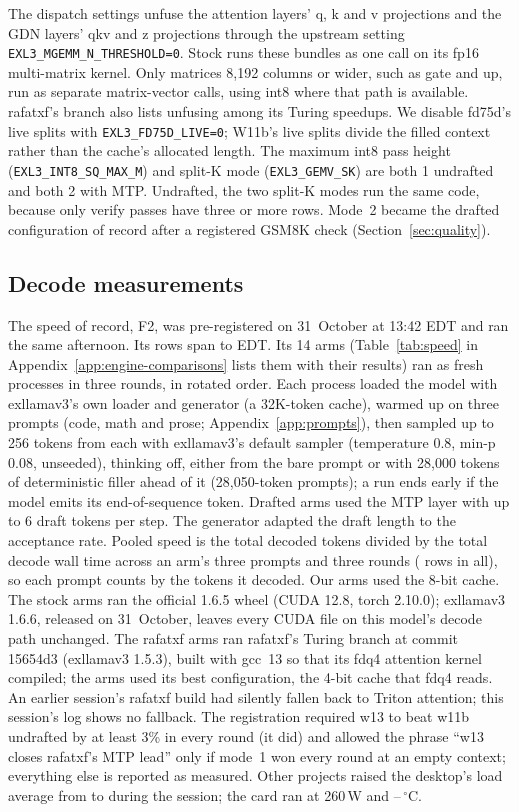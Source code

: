 \documentclass[11pt,letterpaper]{article}
\newcommand{\q}[1]{\texttt{#1}}
\begin{document}
The dispatch settings unfuse the attention layers' q, k and v projections
and the GDN layers' qkv and z projections through the upstream setting
\q{EXL3\_MGEMM\_N\_THRESHOLD=0}. Stock runs these bundles as one call on its
fp16 multi-matrix kernel. Only matrices 8,192 columns or wider, such as gate
and up, run as separate matrix-vector calls, using int8 where that path is
available. rafatxf's branch also lists unfusing among its Turing speedups.
We disable fd75d's live splits with \q{EXL3\_FD75D\_LIVE=0}; W11b's live
splits divide the filled context rather than the cache's allocated length.
The maximum int8 pass height (\q{EXL3\_INT8\_SQ\_MAX\_M}) and split-K mode
(\q{EXL3\_GEMV\_SK}) are both 1 undrafted and both 2 with MTP. Undrafted, the two split-K modes run the
same code, because only verify passes have three or more rows. Mode~2 became
the drafted configuration of record after a registered GSM8K check
(Section~\ref{sec:quality}).



\subsection{Decode measurements}
\label{sec:speedsetup}
The speed of record, F2, was pre-registered on 31~October at 13:42 EDT and
ran the same afternoon. Its rows span \PeFtFirst{} to \PeFtLast{} EDT. Its 14
arms (Table~\ref{tab:speed} in Appendix~\ref{app:engine-comparisons} lists them with their results) ran as fresh
processes in three rounds, in rotated order. Each process loaded the model with exllamav3's own loader and
generator (a 32K-token cache), warmed up on three prompts (code, math and
prose; Appendix~\ref{app:prompts}), then sampled up to 256 tokens from each
with exllamav3's default sampler (temperature 0.8, min-p 0.08, unseeded),
thinking off, either from the bare prompt or with 28,000 tokens of
deterministic filler ahead of it (28,050-token prompts); a run ends early if
the model emits its end-of-sequence token. Drafted arms used the MTP layer
with up to 6 draft tokens per step. The generator adapted the draft length
to the acceptance rate. Pooled speed is the total decoded tokens divided by the total decode wall
time across an arm's three prompts and three rounds
(\PeFtRows{} rows in all), so each prompt counts by the tokens it decoded.
Our arms used the 8-bit cache. The stock arms ran the official 1.6.5 wheel
(CUDA 12.8, torch 2.10.0); exllamav3 1.6.6, released on 31~October, leaves
every CUDA file on this model's decode path unchanged. The rafatxf arms ran rafatxf's Turing branch
\citep{rafatxf2026turing} at commit 15654d3 (exllamav3 1.5.3), built with
gcc~13 so that its fdq4 attention kernel compiled; the arms used its best
configuration, the 4-bit cache that fdq4 reads. An earlier session's rafatxf build had
silently fallen back to Triton attention; this session's log shows no
fallback. The registration required w13 to beat w11b undrafted by at least
3\% in every round (it did) and allowed the phrase ``w13 closes rafatxf's MTP
lead'' only if mode~1 won every round at an empty context; everything else is
reported as measured. Other projects raised the desktop's load average from
\PeFtLoadStart{} to \PeFtLoadEnd{} during the session; the card ran at 260\,W
and \PeFtTempLo--\PeFtTempHi\,$^\circ$C.
\end{document}
